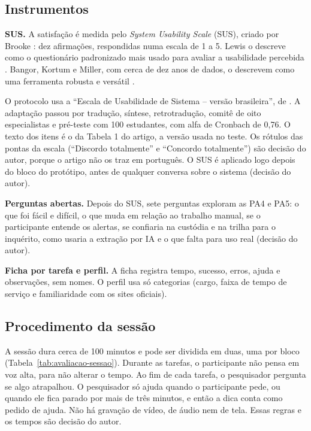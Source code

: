 \subsection{Instrumentos}
\label{sec:avaliacao-instrumentos}

\textbf{SUS.} A satisfação é medida pelo \textit{System Usability Scale}
(SUS), criado por Brooke \cite{brooke1996sus,brooke2013sus}: dez
afirmações, respondidas numa escala de 1 a 5. Lewis o descreve como o
questionário padronizado mais usado para avaliar a usabilidade percebida
\cite{lewis2018sus}. Bangor, Kortum e Miller, com cerca de dez anos de dados,
o descrevem como uma ferramenta robusta e versátil \cite{bangor2008sus}.

O protocolo usa a ``Escala de Usabilidade de Sistema -- versão brasileira'',
de . A adaptação passou por tradução,
síntese, retrotradução, comitê de oito especialistas e pré-teste com 100
estudantes, com alfa de Cronbach de 0,76. O texto dos itens é o da Tabela 1
do artigo, a versão usada no teste. Os rótulos das pontas da escala
(``Discordo totalmente'' e ``Concordo totalmente'') são decisão do autor,
porque o artigo não os traz em português. O SUS é aplicado logo depois do
bloco do protótipo, antes de qualquer conversa sobre o sistema (decisão do
autor).

\textbf{Perguntas abertas.} Depois do SUS, sete perguntas exploram as PA4 e
PA5: o que foi fácil e difícil, o que muda em relação ao trabalho manual, se
o participante entende os alertas, se confiaria na custódia e na trilha para
o inquérito, como usaria a extração por IA e o que falta para uso real
(decisão do autor).

\textbf{Ficha por tarefa e perfil.} A ficha registra tempo, sucesso, erros,
ajuda e observações, sem nomes. O perfil usa só categorias (cargo, faixa de
tempo de serviço e familiaridade com os sites oficiais).

\subsection{Procedimento da sessão}
\label{sec:avaliacao-procedimento}

A sessão dura cerca de 100 minutos e pode ser dividida em duas, uma por
bloco (Tabela~\ref{tab:avaliacao-sessao}). Durante as tarefas, o
participante não pensa em voz alta, para não alterar o tempo. Ao fim de
cada tarefa, o pesquisador pergunta se algo atrapalhou. O pesquisador só
ajuda quando o participante pede, ou quando ele fica parado por mais de três
minutos, e então a dica conta como pedido de ajuda. Não há gravação de
vídeo, de áudio nem de tela. Essas regras e os tempos são decisão do autor.

